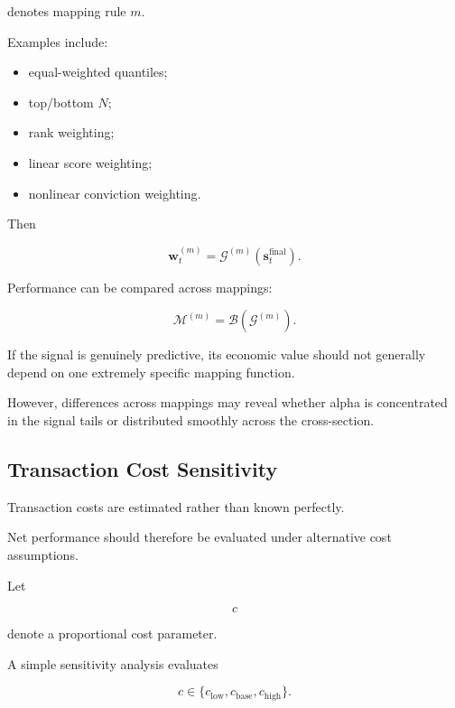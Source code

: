\documentclass[11pt,a4paper]{article}
\begin{document}
denotes mapping rule $m$.

Examples include:

\begin{itemize}
    \item equal-weighted quantiles;
    \item top/bottom $N$;
    \item rank weighting;
    \item linear score weighting;
    \item nonlinear conviction weighting.
\end{itemize}

Then

\begin{equation}
\mathbf{w}_t^{(m)}
=
\mathcal{G}^{(m)}
\left(
\mathbf{s}_t^{\mathrm{final}}
\right).
\end{equation}

Performance can be compared across mappings:

\begin{equation}
\boxed{
\mathcal{M}^{(m)}
=
\mathcal{B}
\left(
\mathcal{G}^{(m)}
\right).
}
\end{equation}

If the signal is genuinely predictive, its economic value should not generally
depend on one extremely specific mapping function.

However, differences across mappings may reveal whether alpha is concentrated
in the signal tails or distributed smoothly across the cross-section.


\subsection{Transaction Cost Sensitivity}
\label{subsec:transaction_cost_sensitivity}

Transaction costs are estimated rather than known perfectly.

Net performance should therefore be evaluated under alternative cost
assumptions.

Let

\begin{equation}
c
\end{equation}

denote a proportional cost parameter.

A simple sensitivity analysis evaluates

\begin{equation}
c
\in
\{
c_{\mathrm{low}},
c_{\mathrm{base}},
c_{\mathrm{high}}
\}.
\end{equation}
\end{document}
